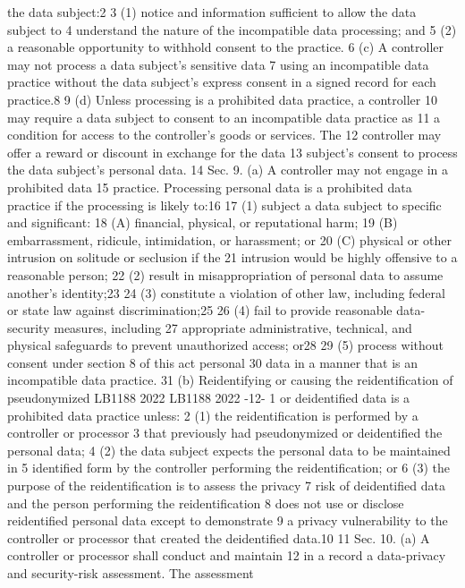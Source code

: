 the data subject:2
3 (1) notice and information sufficient to allow the data subject to
4 understand the nature of the incompatible data processing; and
5 (2) a reasonable opportunity to withhold consent to the practice.
6 (c) A controller may not process a data subject's sensitive data
7 using an incompatible data practice without the data subject's express
consent in a signed record for each practice.8
9 (d) Unless processing is a prohibited data practice, a controller
10 may require a data subject to consent to an incompatible data practice as
11 a condition for access to the controller's goods or services. The
12 controller may offer a reward or discount in exchange for the data
13 subject's consent to process the data subject's personal data.
14 Sec. 9. (a) A controller may not engage in a prohibited data
15 practice. Processing personal data is a prohibited data practice if the
processing is likely to:16
17 (1) subject a data subject to specific and significant:
18 (A) financial, physical, or reputational harm;
19 (B) embarrassment, ridicule, intimidation, or harassment; or
20 (C) physical or other intrusion on solitude or seclusion if the
21 intrusion would be highly offensive to a reasonable person;
22 (2) result in misappropriation of personal data to assume another's
identity;23
24 (3) constitute a violation of other law, including federal or state
law against discrimination;25
26 (4) fail to provide reasonable data-security measures, including
27 appropriate administrative, technical, and physical safeguards to prevent
unauthorized access; or28
29 (5) process without consent under section 8 of this act personal
30 data in a manner that is an incompatible data practice.
31 (b) Reidentifying or causing the reidentification of pseudonymized
LB1188
2022
LB1188
2022
-12-
1 or deidentified data is a prohibited data practice unless:
2 (1) the reidentification is performed by a controller or processor
3 that previously had pseudonymized or deidentified the personal data;
4 (2) the data subject expects the personal data to be maintained in
5 identified form by the controller performing the reidentification; or
6 (3) the purpose of the reidentification is to assess the privacy
7 risk of deidentified data and the person performing the reidentification
8 does not use or disclose reidentified personal data except to demonstrate
9 a privacy vulnerability to the controller or processor that created the
deidentified data.10
11 Sec. 10. (a) A controller or processor shall conduct and maintain
12 in a record a data-privacy and security-risk assessment. The assessment
